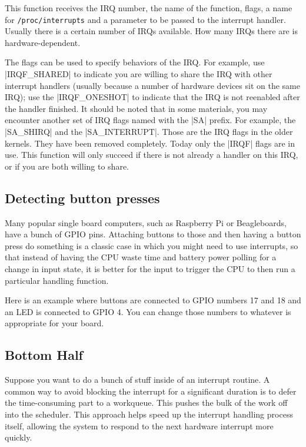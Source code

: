 \documentclass[10pt, oneside]{book}
\begin{document}
This function receives the IRQ number, the name of the function, flags, a name for \verb|/proc/interrupts| and a parameter to be passed to the interrupt handler.
Usually there is a certain number of IRQs available.
How many IRQs there are is hardware-dependent.

The flags can be used to specify behaviors of the IRQ.
For example, use \cpp|IRQF_SHARED| to indicate you are willing to share the IRQ with other interrupt handlers (usually because a number of hardware devices sit on the same IRQ); use the \cpp|IRQF_ONESHOT| to indicate that the IRQ is not reenabled after the handler finished.
It should be noted that in some materials, you may encounter another set of IRQ flags named with the \cpp|SA| prefix.
For example, the \cpp|SA_SHIRQ| and the \cpp|SA_INTERRUPT|.
Those are the IRQ flags in the older kernels.
They have been removed completely.
Today only the \cpp|IRQF| flags are in use.
This function will only succeed if there is not already a handler on this IRQ, or if you are both willing to share.

\subsection{Detecting button presses}
\label{sec:detect_button}
Many popular single board computers, such as Raspberry Pi or Beagleboards, have a bunch of GPIO pins.
Attaching buttons to those and then having a button press do something is a classic case in which you might need to use interrupts,
so that instead of having the CPU waste time and battery power polling for a change in input state, it is better for the input to trigger the CPU to then run a particular handling function.

Here is an example where buttons are connected to GPIO numbers 17 and 18 and an LED is connected to GPIO 4.
You can change those numbers to whatever is appropriate for your board.


\subsection{Bottom Half}
\label{sec:bottom_half}
Suppose you want to do a bunch of stuff inside of an interrupt routine.
A common way to avoid blocking the interrupt for a significant duration
is to defer the time-consuming part to a workqueue.
This pushes the bulk of the work off into the scheduler.
This approach helps speed up the interrupt handling process itself,
allowing the system to respond to the next hardware interrupt more quickly.
\end{document}
